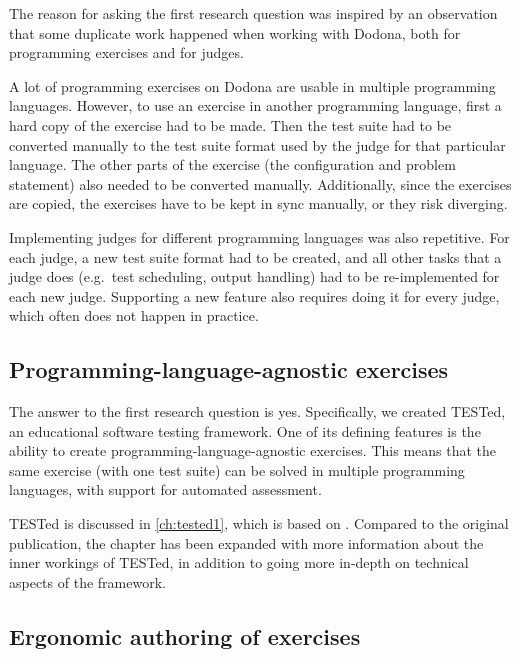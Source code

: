 \documentclass[../main]{subfiles}
\begin{document}
The reason for asking the first research question was inspired by an observation that some duplicate work happened when working with Dodona, both for programming exercises and for judges.

A lot of programming exercises on Dodona are usable in multiple programming languages.
However, to use an exercise in another programming language, first a hard copy of the exercise had to be made.
Then the test suite had to be converted manually to the test suite format used by the judge for that particular language.
The other parts of the exercise (the configuration and problem statement) also needed to be converted manually.
Additionally, since the exercises are copied, the exercises have to be kept in sync manually, or they risk diverging.

Implementing judges for different programming languages was also repetitive.
For each judge, a new test suite format had to be created, and all other tasks that a judge does (e.g.\ test scheduling, output handling) had to be re-implemented for each new judge.
Supporting a new feature also requires doing it for every judge, which often does not happen in practice.

\subsection{Programming-language-agnostic exercises}\label{subsec:programming-language-agnostic-testing}

The answer to the first research question is yes.
Specifically, we created TESTed, an educational software testing framework.
One of its defining features is the ability to create programming-language-agnostic exercises.
This means that the same exercise (with one test suite) can be solved in multiple programming languages, with support for automated assessment.

TESTed is discussed in \cref{ch:tested1}, which is based on \textcite{strijbolTESTedEducationalTesting2023}.
Compared to the original publication, the chapter has been expanded with more information about the inner workings of TESTed, in addition to going more in-depth on technical aspects of the framework.

\subsection{Ergonomic authoring of exercises}\label{subsec:ergonomic-testing}
\end{document}
